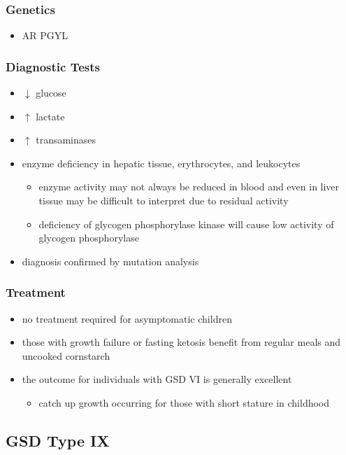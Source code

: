 \documentclass[12pt]{scrartcl}
\begin{document}
\subsubsection{Genetics}
\label{sec:orgb8fe4a2}
\begin{itemize}
\item AR PGYL
\end{itemize}
\subsubsection{Diagnostic Tests}
\label{sec:orgf64152a}
\begin{itemize}
\item \(\downarrow\) glucose
\item \(\uparrow\) lactate
\item \(\uparrow\) transaminases
\item enzyme deficiency in hepatic tissue, erythrocytes, and leukocytes
\begin{itemize}
\item enzyme activity may not always be reduced in blood and even in liver
tissue may be difficult to interpret due to residual activity
\item deficiency of glycogen phosphorylase kinase will cause
low activity of glycogen phosphorylase
\end{itemize}
\item diagnosis confirmed by mutation analysis
\end{itemize}
\subsubsection{Treatment}
\label{sec:org77e29c4}
\begin{itemize}
\item no treatment required for asymptomatic children
\item those with growth failure or fasting ketosis benefit from regular
meals and uncooked cornstarch
\item the outcome for individuals with GSD VI is generally excellent
\begin{itemize}
\item catch up growth occurring for those with short stature in childhood
\end{itemize}
\end{itemize}
\subsection{GSD Type IX}
\label{sec:orgcb26524}
\end{document}
